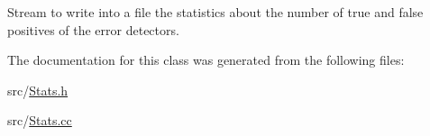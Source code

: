 Stream to write into a file the statistics about the number of true and false positives of the error detectors. 



The documentation for this class was generated from the following files\+:\begin{DoxyCompactItemize}
\item 
src/\hyperlink{_stats_8h}{Stats.\+h}\item 
src/\hyperlink{_stats_8cc}{Stats.\+cc}\end{DoxyCompactItemize}
